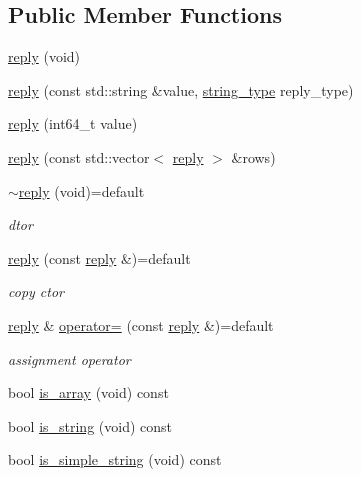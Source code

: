 \subsection*{Public Member Functions}
\begin{DoxyCompactItemize}
\item 
\hyperlink{classcpp__redis_1_1reply_a8d0b1f8a18b5c7c3ce79784604dba6cc}{reply} (void)
\item 
\hyperlink{classcpp__redis_1_1reply_a58fb2a051a001f1c3dcf2cd957441dbc}{reply} (const std\+::string \&value, \hyperlink{classcpp__redis_1_1reply_ac192ba4cb8f2bb6e7cb465edf755328b}{string\+\_\+type} reply\+\_\+type)
\item 
\hyperlink{classcpp__redis_1_1reply_a6200b9fa76196e75fb18aa07e47391f0}{reply} (int64\+\_\+t value)
\item 
\hyperlink{classcpp__redis_1_1reply_af3e08b6b795978757a05a1ac4bb08c68}{reply} (const std\+::vector$<$ \hyperlink{classcpp__redis_1_1reply}{reply} $>$ \&rows)
\item 
\hyperlink{classcpp__redis_1_1reply_a1acfe6cbc763368cc2a9eef25afffe35}{$\sim$reply} (void)=default
\begin{DoxyCompactList}\small\item\em dtor \end{DoxyCompactList}\item 
\hyperlink{classcpp__redis_1_1reply_a247955712c519daffcf740ae163e69bb}{reply} (const \hyperlink{classcpp__redis_1_1reply}{reply} \&)=default
\begin{DoxyCompactList}\small\item\em copy ctor \end{DoxyCompactList}\item 
\hyperlink{classcpp__redis_1_1reply}{reply} \& \hyperlink{classcpp__redis_1_1reply_a3482157af73f4a60a6386f057e484e5b}{operator=} (const \hyperlink{classcpp__redis_1_1reply}{reply} \&)=default
\begin{DoxyCompactList}\small\item\em assignment operator \end{DoxyCompactList}\item 
bool \hyperlink{classcpp__redis_1_1reply_a3a94881a46125d281cb36191c4b7d19a}{is\+\_\+array} (void) const
\item 
bool \hyperlink{classcpp__redis_1_1reply_a7072729490fdbad26ddeb02df8002147}{is\+\_\+string} (void) const
\item 
bool \hyperlink{classcpp__redis_1_1reply_aeb92f6f84d226239e9800893ab6062ca}{is\+\_\+simple\+\_\+string} (void) const

\end{DoxyCompactItemize}
